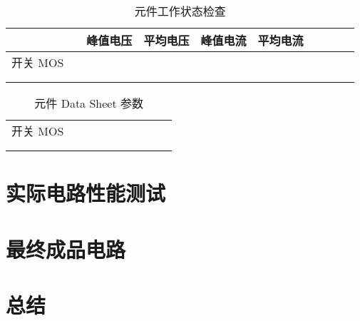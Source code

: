 \documentclass[UTF8]{report}
\theoremstyle{MyLineTheoremStyle} %
\theoremstyle{MyBlockTheoremStyle} %
\theoremstyle{MySubsubsectionStyle} %
\begin{document}
\begin{table}[H]\centering
    \caption{元件工作状态检查}
    \label{元件工作状态检查}
\begin{tabular}{cccccccccc}\toprule
     &       & 峰值电压 & 平均电压 & 峰值电流 & 平均电流 \\
    \midrule
    开关 MOS &  &  \\
     &  &   \\
     &  &   \\
    \bottomrule
\end{tabular}
\end{table}
\begin{table}[H]\centering
    \caption{元件 Data Sheet 参数}
    \label{元件 Data Sheet 参数}
\begin{tabular}{cccccccccc}\toprule
     &  &   \\
    \midrule
    开关 MOS &  &   \\
     &  &   \\
     &  &   \\
    \bottomrule
\end{tabular}
\end{table}

\section{实际电路性能测试}



\section{最终成品电路}

\section{总结}





\end{document}
